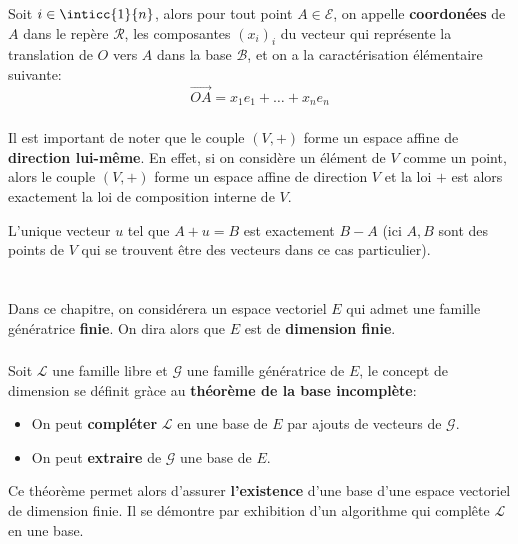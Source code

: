 Soit \(i\in\inticc{1}{n}\), alors pour tout point \(A \in \mathscr{E}\), on appelle \textbf{coordonées} de \(A\) dans le repère \(\mathscr{R}\), les composantes \((x_i)_i\) du vecteur qui représente la translation de \(O\) vers \(A\) dans la base \(\mathscr{B}\), et on a la caractérisation élémentaire suivante:
\[
   \overrightarrow{OA} = x_1e_1 + \ldots + x_ne_n 
\]
\subsection*{}
Il est important de noter que le couple \((V, +)\) forme un espace affine de \textbf{direction lui-même}. En effet, si on considère un élément de \(V\) comme un point, alors le couple  \((V, +)\) forme un espace affine de direction \(V\) et la loi \(+\) est alors exactement la loi de composition interne de \(V\).\<

L'unique vecteur \(u\) tel que \(A + u = B\) est exactement \(B - A\) (ici \(A, B\) sont des points de \(V\) qui se trouvent être des vecteurs dans ce cas particulier).
\chapter*{} %

Dans ce chapitre, on considérera un espace vectoriel \(E\) qui admet une famille génératrice \textbf{finie}. On dira alors que \(E\) est de \textbf{dimension finie}.

\subsection*{}

Soit \(\mathcal{L}\) une famille libre et \(\mathcal{G}\) une famille génératrice de \(E\), le concept de dimension se définit gràce au \textbf{théorème de la base incomplète}:
\begin{itemize}
   \item On peut \textbf{compléter} \(\mathcal{L}\) en une base de \(E\) par ajouts de vecteurs de \(\mathcal{G}\).
   \item On peut \textbf{extraire} de \(\mathcal{G}\) une base de \(E\).
\end{itemize}
Ce théorème permet alors d'assurer \textbf{l'existence} d'une base d'une espace vectoriel de dimension finie. Il se démontre par exhibition d'un algorithme qui complête \( \mathcal{L} \) en une base.
